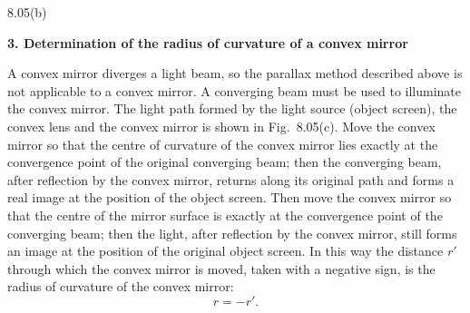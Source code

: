 \begin{figbox}{8.05(b)}
\end{figbox}

\textbf{3. Determination of the radius of curvature of a convex mirror}

A convex mirror diverges a light beam, so the parallax method described above is not applicable to a convex mirror. A converging beam must be used to illuminate the convex mirror. The light path formed by the light source (object screen), the convex lens and the convex mirror is shown in Fig.~8.05(c). Move the convex mirror so that the centre of curvature of the convex mirror lies exactly at the convergence point of the original converging beam; then the converging beam, after reflection by the convex mirror, returns along its original path and forms a real image at the position of the object screen. Then move the convex mirror so that the centre of the mirror surface is exactly at the convergence point of the converging beam; then the light, after reflection by the convex mirror, still forms an image at the position of the original object screen. In this way the distance $r'$ through which the convex mirror is moved, taken with a negative sign, is the radius of curvature of the convex mirror:
\[
r=-r'.
\]


